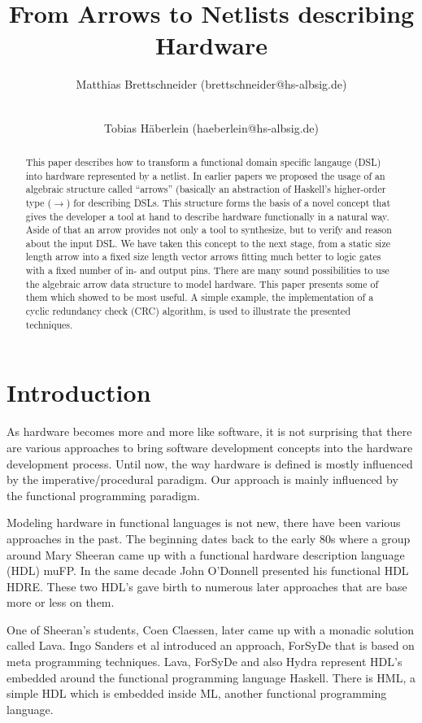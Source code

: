 \documentclass{llncs}
\title{From Arrows to Netlists describing Hardware}
\author{Matthias Brettschneider (brettschneider@hs-albsig.de) \and \\ Tobias H{\"a}berlein (haeberlein@hs-albsig.de)}
\institute{Albstadt-Sigmaringen University}
\begin{document}
\maketitle


\begin{abstract}
  This paper describes how to transform a functional domain specific langauge (DSL) into hardware represented by a netlist. In
  earlier papers we proposed the usage of an algebraic structure called ``arrows'' (basically an abstraction of Haskell's
  higher-order type ($\rightarrow$) for describing DSLs. This structure forms the basis of a novel concept that gives the
  developer a tool at hand to describe hardware functionally in a natural way. Aside of that an arrow provides not only a tool to
  synthesize, but to verify and reason about the input DSL. We have taken this concept to the next stage, from a static size
  length arrow into a fixed size length vector arrows fitting much better to logic gates with a fixed number of in- and output
  pins. There are many sound possibilities to use the algebraic arrow data structure to model hardware. This paper presents some
  of them which showed to be most useful. A simple example, the implementation of a cyclic redundancy check (CRC) algorithm, is
  used to illustrate the presented techniques.
\end{abstract}


\section{Introduction}
\label{recent_approaches}
As hardware becomes more and more like software, it is not surprising that there are various approaches to bring software
development concepts into the hardware development process. Until now, the way hardware is defined is mostly influenced by the
imperative/procedural paradigm. Our approach is mainly influenced by the functional programming paradigm.

\par
Modeling hardware in functional languages is not new, there have been various approaches in the past. The beginning dates back to
the early 80s where a group around Mary Sheeran came up with a functional hardware description language (HDL)
muFP\cite{sheeran:muFP}. In the same decade John O'Donnell presented his functional HDL HDRE\cite{hydra:old,donnell}. These two
HDL's gave birth to numerous later approaches that are base more or less on them.

\par
One of Sheeran's students, Coen Claessen, later came up with a monadic solution called Lava\cite{claessen:hardware}. Ingo Sanders
et al introduced an approach, ForSyDe \cite{forsyde:phd,forsyde:ieee} that is based on meta programming techniques. Lava, ForSyDe
and also Hydra \cite{donnell} represent HDL's embedded around the functional programming language Haskell. There is HML\cite{hml},
a simple HDL which is embedded inside ML, another functional programming language.
\end{document}
